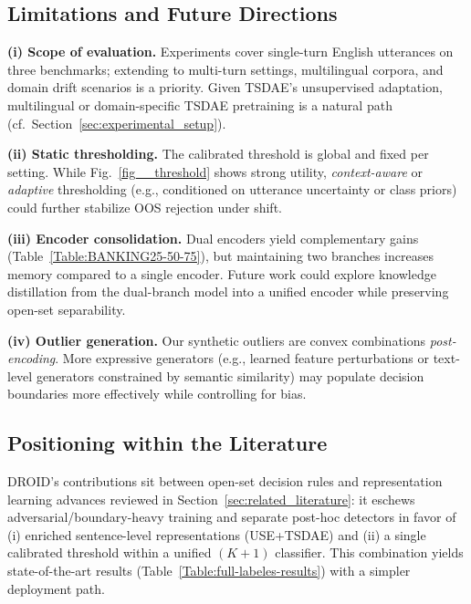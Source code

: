 \documentclass[journal,letterpaper]{IEEEtran}
\begin{document}
\subsection{Limitations and Future Directions}
\textbf{(i) Scope of evaluation.} Experiments cover single-turn English utterances on three benchmarks; extending to multi-turn settings, multilingual corpora, and domain drift scenarios is a priority. Given TSDAE’s unsupervised adaptation, multilingual or domain-specific TSDAE pretraining is a natural path (cf.\ Section~\ref{sec:experimental_setup}).

\textbf{(ii) Static thresholding.} The calibrated threshold is global and fixed per setting. While Fig.~\ref{fig__threshold} shows strong utility, \emph{context-aware} or \emph{adaptive} thresholding (e.g., conditioned on utterance uncertainty or class priors) could further stabilize OOS rejection under shift.

\textbf{(iii) Encoder consolidation.} Dual encoders yield complementary gains (Table~\ref{Table:BANKING25-50-75}), but maintaining two branches increases memory compared to a single encoder. Future work could explore knowledge distillation from the dual-branch model into a unified encoder while preserving open-set separability.

\textbf{(iv) Outlier generation.} Our synthetic outliers are convex combinations \emph{post-encoding}. More expressive generators (e.g., learned feature perturbations or text-level generators constrained by semantic similarity) may populate decision boundaries more effectively while controlling for bias.

\subsection{Positioning within the Literature}
DROID’s contributions sit between open-set decision rules and representation learning advances reviewed in Section~\ref{sec:related_literature}: it eschews adversarial/boundary-heavy training \cite{Zhang_2021,DA-ADB_2023} and separate post-hoc detectors \cite{xu-etal-2021-unsupervised} in favor of (i) enriched sentence-level representations (USE+TSDAE) and (ii) a single calibrated threshold within a unified \((K{+}1)\) classifier. This combination yields state-of-the-art results (Table~\ref{Table:full-labeles-results}) with a simpler deployment path.
\end{document}
